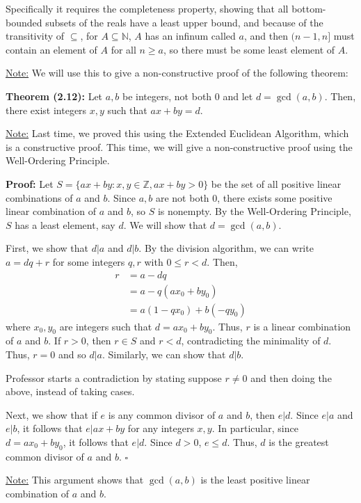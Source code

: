 \documentclass{article}
\newcommand*{\qed}{\hfill$\square$}%
\newcommand*{\zz}{\mathbb{Z}}%
\newenvironment{aside}{\begin{siderules}\setlength{\leftskip}{0.3cm}}{\end{siderules}\setlength{\leftskip}{0pt}}
\begin{document}
Specifically it requires the completeness property, showing that all bottom-bounded subsets of the reals have a least upper bound, and because of the transitivity of $\subseteq$, for $A\subseteq \mathbb{N}$, $A$ has an infinum called $a$, and then $(n-1,n]$ must contain an element of $A$ for all $n\geq a$, so there must be some least element of $A$.

\underline{Note:} We will use this to give a non-constructive proof of the following theorem:

\textbf{Theorem (2.12):} Let $a,b$ be integers, not both 0 and let $d=\gcd(a,b)$. Then, there exist integers $x,y$ such that $ax+by=d$.

\underline{Note:} Last time, we proved this using the Extended Euclidean Algorithm, which is a constructive proof. This time, we will give a non-constructive proof using the Well-Ordering Principle.

\textbf{Proof:} Let $S=\{ ax+by : x,y\in \zz, ax+by>0 \}$ be the set of all positive linear combinations of $a$ and $b$. Since $a,b$ are not both 0, there exists some positive linear combination of $a$ and $b$, so $S$ is nonempty. By the Well-Ordering Principle, $S$ has a least element, say $d$. We will show that $d=\gcd(a,b)$.

First, we show that $d|a$ and $d|b$. By the division algorithm, we can write $a=dq+r$ for some integers $q,r$ with $0\leq r<d$. Then, \begin{align*}
    r &= a - dq \\
      &= a - q(ax_0 + by_0) \\
      &= a(1-qx_0) + b(-qy_0)
\end{align*}where $x_0,y_0$ are integers such that $d=ax_0+by_0$. Thus, $r$ is a linear combination of $a$ and $b$. If $r>0$, then $r\in S$ and $r<d$, contradicting the minimality of $d$. Thus, $r=0$ and so $d|a$. Similarly, we can show that $d|b$.

\begin{aside}
Professor starts a contradiction by stating suppose $r\neq 0$ and then doing the above, instead of taking cases. 
\end{aside}

Next, we show that if $e$ is any common divisor of $a$ and $b$, then $e|d$. Since $e|a$ and $e|b$, it follows that $e|ax+by$ for any integers $x,y$. In particular, since $d=ax_0+by_0$, it follows that $e|d$. Since $d>0$, $e\leq d$. Thus, $d$ is the greatest common divisor of $a$ and $b$. \qed

\underline{Note:} This argument shows that $\gcd(a,b)$ is the least positive linear combination of $a$ and $b$.
\end{document}
